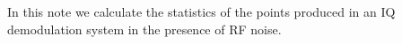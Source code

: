 In this note we calculate the statistics of the points produced in an IQ demodulation system in the presence of RF noise.

